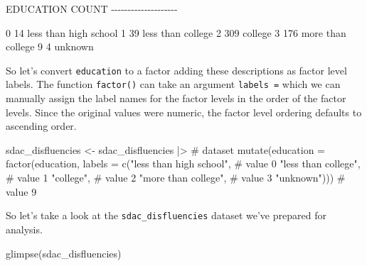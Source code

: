 \documentclass[
  letterpaper,
]{latex/krantz}
\newenvironment{Shaded}{\begin{snugshade}}{\end{snugshade}}
\newcommand{\AttributeTok}[1]{\textcolor[rgb]{0.40,0.45,0.13}{#1}}
\newcommand{\CommentTok}[1]{\textcolor[rgb]{0.37,0.37,0.37}{#1}}
\newcommand{\FunctionTok}[1]{\textcolor[rgb]{0.28,0.35,0.67}{#1}}
\newcommand{\NormalTok}[1]{\textcolor[rgb]{0.00,0.23,0.31}{#1}}
\newcommand{\OtherTok}[1]{\textcolor[rgb]{0.00,0.23,0.31}{#1}}
\newcommand{\SpecialCharTok}[1]{\textcolor[rgb]{0.37,0.37,0.37}{#1}}
\newcommand{\StringTok}[1]{\textcolor[rgb]{0.13,0.47,0.30}{#1}}
\begin{document}
\begin{Shaded}
\begin{Highlighting}[]
\NormalTok{EDUCATION    COUNT}
\NormalTok{{-}{-}{-}{-}{-}{-}{-}{-}{-}{-}{-}{-}{-}{-}{-}{-}{-}{-}{-}{-}}

\NormalTok{0            14      less than high school}
\NormalTok{1            39      less than college}
\NormalTok{2            309     college}
\NormalTok{3            176     more than college}
\NormalTok{9            4       unknown}
\end{Highlighting}
\end{Shaded}

So let's convert \texttt{education} to a factor adding these
descriptions as factor level labels. The function \texttt{factor()} can
take an argument \texttt{labels\ =} which we can manually assign the
label names for the factor levels in the order of the factor levels.
Since the original values were numeric, the factor level ordering
defaults to ascending order.

\begin{Shaded}
\begin{Highlighting}[]
\NormalTok{sdac\_disfluencies }\OtherTok{\textless{}{-}} 
\NormalTok{  sdac\_disfluencies }\SpecialCharTok{|\textgreater{}} \CommentTok{\# dataset}
  \FunctionTok{mutate}\NormalTok{(}\AttributeTok{education =} \FunctionTok{factor}\NormalTok{(education, }
                            \AttributeTok{labels =} \FunctionTok{c}\NormalTok{(}\StringTok{"less than high school"}\NormalTok{, }\CommentTok{\# value 0}
                                       \StringTok{"less than college"}\NormalTok{, }\CommentTok{\# value 1}
                                       \StringTok{"college"}\NormalTok{, }\CommentTok{\# value 2}
                                       \StringTok{"more than college"}\NormalTok{, }\CommentTok{\# value 3 }
                                       \StringTok{"unknown"}\NormalTok{))) }\CommentTok{\# value 9}
\end{Highlighting}
\end{Shaded}

So let's take a look at the \texttt{sdac\_disfluencies} dataset we've
prepared for analysis.

\begin{Shaded}
\begin{Highlighting}[]
\FunctionTok{glimpse}\NormalTok{(sdac\_disfluencies)}
\end{Highlighting}
\end{Shaded}
\end{document}
